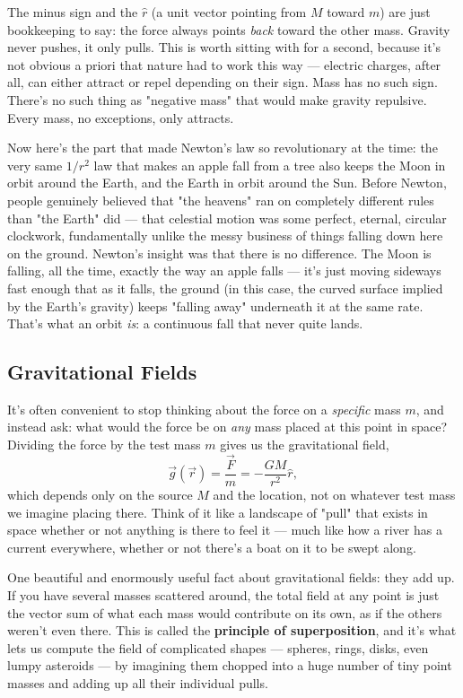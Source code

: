 \documentclass[11pt]{article}
\begin{document}
The minus sign and the $\hat r$ (a unit vector pointing from $M$ toward $m$) are just bookkeeping
to say: the force always points \emph{back} toward the other mass. Gravity never pushes, it only
pulls. This is worth sitting with for a second, because it's not obvious a priori that nature had
to work this way --- electric charges, after all, can either attract or repel depending on their
sign. Mass has no such sign. There's no such thing as "negative mass" that would make gravity
repulsive. Every mass, no exceptions, only attracts.

Now here's the part that made Newton's law so revolutionary at the time: the very same $1/r^2$ law
that makes an apple fall from a tree also keeps the Moon in orbit around the Earth, and the Earth
in orbit around the Sun. Before Newton, people genuinely believed that "the heavens" ran on
completely different rules than "the Earth" did --- that celestial motion was some perfect,
eternal, circular clockwork, fundamentally unlike the messy business of things falling down here
on the ground. Newton's insight was that there is no difference. The Moon is falling, all the
time, exactly the way an apple falls --- it's just moving sideways fast enough that as it falls,
the ground (in this case, the curved surface implied by the Earth's gravity) keeps "falling away"
underneath it at the same rate. That's what an orbit \emph{is}: a continuous fall that never quite
lands.

\subsection*{Gravitational Fields}

It's often convenient to stop thinking about the force on a \emph{specific} mass $m$, and instead
ask: what would the force be on \emph{any} mass placed at this point in space? Dividing the force
by the test mass $m$ gives us the gravitational field,
\[
\vec g(\vec r) = \frac{\vec F}{m} = -\frac{GM}{r^2}\hat r,
\]
which depends only on the source $M$ and the location, not on whatever test mass we imagine
placing there. Think of it like a landscape of "pull" that exists in space whether or not
anything is there to feel it --- much like how a river has a current everywhere, whether or not
there's a boat on it to be swept along.

One beautiful and enormously useful fact about gravitational fields: they add up. If you have
several masses scattered around, the total field at any point is just the vector sum of what each
mass would contribute on its own, as if the others weren't even there. This is called the
\textbf{principle of superposition}, and it's what lets us compute the field of complicated shapes
--- spheres, rings, disks, even lumpy asteroids --- by imagining them chopped into a huge number of
tiny point masses and adding up all their individual pulls.
\end{document}
